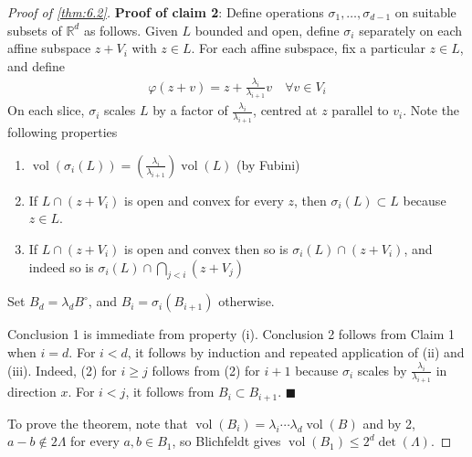 \documentclass{article}
\DeclareMathOperator{\vol}{vol}
\numberwithin{equation}{section}
\begin{document}
\begin{proof}[Proof of \cref{thm:6.2}]
  \textbf{Proof of claim 2}: Define operations $\sigma_1, \dotsc, \sigma_{d-1}$ on suitable subsets of $\mathbb{R}^d$ as follows.
  Given $L$ bounded and open, define $\sigma_i$ separately on each affine subspace $z + V_i$ with $z \in L$.
  For each affine subspace, fix a particular $z \in L$, and define
  \begin{align*}
    \varphi(z+v) = z + \frac{\lambda_i}{\lambda_{i+1}} v\quad \forall v \in V_i
  \end{align*}
  On each slice, $\sigma_i$ scales $L$ by a factor of $\frac{\lambda_i}{\lambda_{i+1}}$, centred at $z$ parallel to $v_i$.
  Note the following properties
  \begin{enumerate}[label=(\roman*)]
    \item $\vol(\sigma_i(L)) = (\frac{\lambda_i}{\lambda_{i+1}}) \vol(L)$ (by Fubini)
    \item If $L \cap (z + V_i)$ is open and convex for every $z$, then $\sigma_i(L) \subset L$ because $z \in L$.
    \item If $L \cap (z + V_i)$ is open and convex then so is $\sigma_i(L) \cap (z + V_i)$, and indeed so is $\sigma_i(L) \cap \bigcap_{j < i} (z + V_j)$
  \end{enumerate}
  Set $B_d = \lambda_d B^\circ$, and $B_i = \sigma_i(B_{i+1})$ otherwise.

  Conclusion 1 is immediate from property (i). Conclusion 2 follows from Claim 1 when $i=d$.
  For $i < d$, it follows by induction and repeated application of (ii) and (iii).
  Indeed, (2) for $i \geq j$ follows from (2) for $i+1$ because $\sigma_i$ scales by $\frac{\lambda_i}{\lambda_{i+1}}$ in direction $x$.
  For $i < j$, it follows from $B_i \subset B_{i+1}$. $\blacksquare$

  To prove the theorem, note that $\vol(B_i) = \lambda_i \dotsm \lambda_d \vol(B)$ and by 2, $a - b \notin 2\Lambda$ for every $a,b \in B_1$, so Blichfeldt gives $\vol(B_1) \leq 2^d \det(\Lambda)$.
\end{proof}
\end{document}
